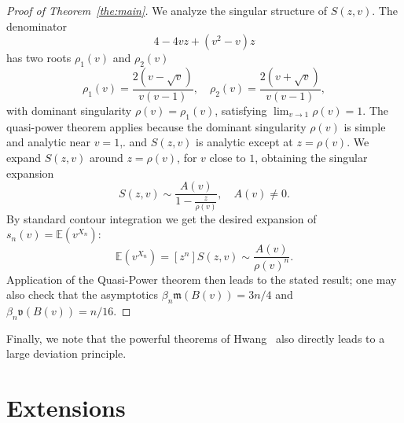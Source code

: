 \documentclass[10pt,reqno,a4paper]{amsart}
\theoremstyle{definition}
\def\E{{\mathbb {E}}}
\newcommand{\fm}{\ensuremath{\mathfrak{m}}}
\newcommand{\fv}{\ensuremath{\mathfrak{v}}}
\begin{document}
\begin{proof}[Proof of Theorem~\ref{the:main}]
We analyze the singular structure of $S(z,v)$. The denominator 
\[
4-4vz+(v^2-v)z
\]
has two roots $\rho_1(v)$ and $\rho_2(v)$
\[
\rho_1(v)=\frac{2(v-\sqrt{v})}{v(v-1)},
\quad \rho_2(v)=\frac{2(v+\sqrt{v})}{v(v-1)},
\]
with dominant singularity $\rho(v)=\rho_1(v)$, satisfying 
$\lim_{v\to 1} \rho(v)=1$. The quasi-power theorem applies because the dominant singularity $\rho(v)$ is simple and analytic near $v=1$,.
and $S(z,v)$ is analytic except at $z=\rho(v)$. We expand $S(z,v)$ around $z=\rho(v)$, for $v$ close to $1$, 
obtaining the singular expansion
\[
S(z,v)\sim \frac{A(v)}{1 - \frac{z}{\rho(v)}}, \quad A(v) \neq 0.
\]
By standard contour integration we get the desired expansion of $s_n(v)=\E(v^{X_n})$:
\[
\E(v^{X_n})=[z^n]S(z,v)\sim \frac{A(v)}{\rho(v)^n}.
\]
Application of the Quasi-Power theorem then leads to the stated result; one may also check that the asymptotics $\beta_n\fm(B(v))=3n/4$ and
$\beta_n\fv(B(v))=n/16$.
\end{proof}

Finally, we note that the powerful theorems of Hwang~\cite{Hwang1996LargeDeviationsI} also directly leads to a large deviation principle. 

\section{Extensions}
\end{document}
